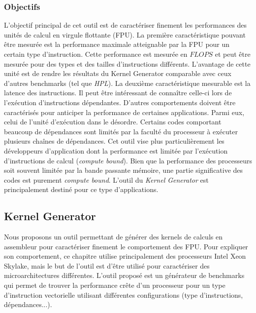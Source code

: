        
 
        

    
    \subsubsection{Objectifs}
    
        L'objectif principal de cet outil est de caractériser finement les performances des unités de calcul en virgule flottante (FPU). 
        La première caractéristique pouvant être mesurée est la performance maximale atteignable par la FPU pour un certain type d'instruction. Cette performance est mesurée en $FLOPS$ et peut être mesurée pour des types et des tailles d'instructions différents. L'avantage de cette unité est de rendre les résultats du Kernel Generator comparable avec ceux d'autres benchmarks (tel que \textit{HPL}). 
        La deuxième caractéristique mesurable est la latence des instructions. Il peut être intéressant de connaître celle-ci lors de l'exécution d'instructions dépendantes.
        D'autres comportements doivent être caractérisés pour anticiper la performance de certaines applications. Parmi eux, celui de l'unité d'exécution dans le désordre. Certains codes comportant beaucoup de dépendances sont limités par la faculté du processeur à exécuter plusieurs chaînes de dépendances. Cet outil vise plus particulièrement les développeurs d'application dont la performance est limitée par l'exécution d'instructions de calcul (\textit{compute bound}). Bien que la performance des processeurs soit souvent limitée par la bande passante mémoire, une partie significative des codes est purement \textit{compute bound}. L'outil du \textit{Kernel Generator} est principalement destiné pour ce type d'applications.


        
\subsection{Kernel Generator}    

        Nous proposons un outil permettant de générer des kernels de calculs en assembleur pour caractériser finement le comportement des FPU. Pour expliquer son comportement, ce chapitre utilise principalement des processeurs Intel Xeon Skylake, mais le but de l'outil est d'être utilisé pour caractériser des microarchitectures différentes. 
        L'outil proposé est un générateur de benchmarks qui permet de trouver la performance crête d'un processeur pour un type d'instruction vectorielle utilisant différentes configurations (type d'instructions, dépendances...).
        
